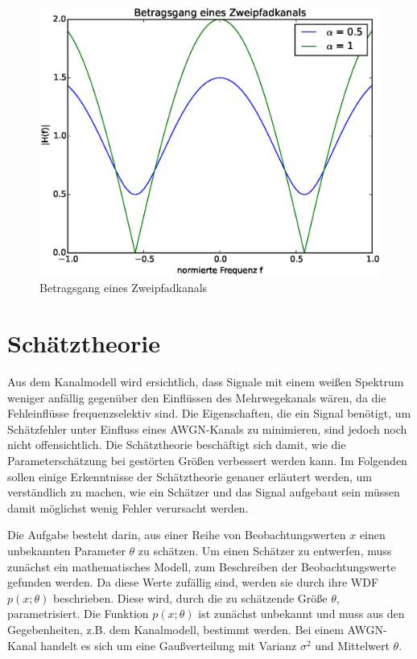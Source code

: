\begin{figure}[htbp]
	\centering
	\includegraphics[scale=0.5]{images/MutipathSim_abs}
	\caption{Betragsgang eines Zweipfadkanals}
	\label{fig:MutipathSim_abs}
\end{figure}

\section{Schätztheorie}
\label{chap2.3:Schätztheorie}
Aus dem Kanalmodell wird ersichtlich, dass Signale mit einem weißen Spektrum weniger anfällig gegenüber den Einflüssen des Mehrwegekanals wären, da die Fehleinflüsse frequenzselektiv sind. Die Eigenschaften, die ein Signal benötigt, um Schätzfehler unter Einfluss eines \gls{AWGN}-Kanals zu minimieren, sind jedoch noch nicht offensichtlich. Die Schätztheorie beschäftigt sich damit, wie die Parameterschätzung bei gestörten Größen verbessert werden kann. Im Folgenden sollen einige Erkenntnisse der Schätztheorie genauer erläutert werden, um verständlich zu machen, wie ein Schätzer und das Signal aufgebaut sein müssen damit möglichst wenig Fehler verursacht werden. 

Die Aufgabe besteht darin, aus einer Reihe von Beobachtungswerten $x$ einen unbekannten Parameter $\theta$ zu schätzen. 
Um einen Schätzer zu entwerfen, muss zunächst ein mathematisches Modell, zum Beschreiben der Beobachtungswerte gefunden werden. Da diese Werte zufällig sind, werden sie durch ihre \gls{WDF} $p(x;\theta)$ beschrieben. Diese wird, durch die zu schätzende Größe $\theta$, parametrisiert. Die Funktion $p(x;\theta)$ ist zunächst unbekannt und muss aus den Gegebenheiten, z.B. dem Kanalmodell, bestimmt werden.  Bei einem \gls{AWGN}-Kanal handelt es sich um eine Gaußverteilung mit Varianz $\sigma^2$ und Mittelwert $\theta$. 

